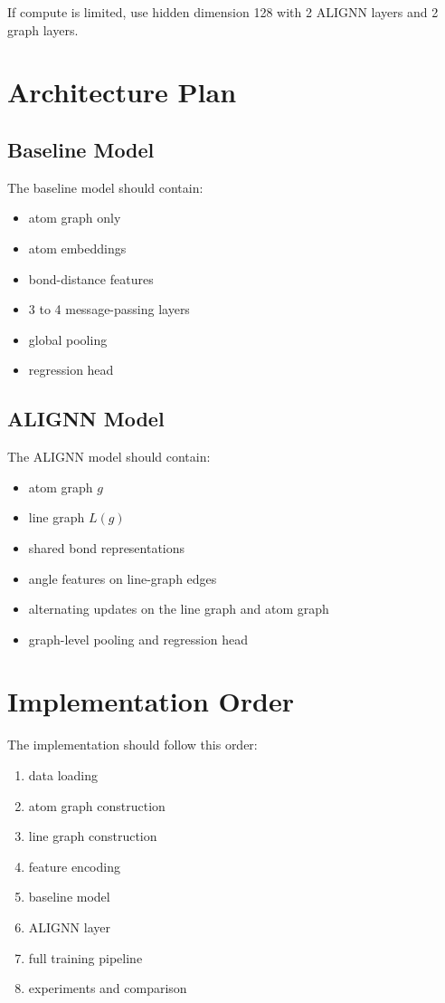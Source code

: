 \documentclass[12pt]{article}
\begin{document}
If compute is limited, use hidden dimension 128 with 2 ALIGNN layers and 2 graph layers.

\section{Architecture Plan}
\subsection{Baseline Model}
The baseline model should contain:
\begin{itemize}
    \item atom graph only
    \item atom embeddings
    \item bond-distance features
    \item 3 to 4 message-passing layers
    \item global pooling
    \item regression head
\end{itemize}

\subsection{ALIGNN Model}
The ALIGNN model should contain:
\begin{itemize}
    \item atom graph \(g\)
    \item line graph \(L(g)\)
    \item shared bond representations
    \item angle features on line-graph edges
    \item alternating updates on the line graph and atom graph
    \item graph-level pooling and regression head
\end{itemize}

\section{Implementation Order}
The implementation should follow this order:

\begin{enumerate}
    \item data loading
    \item atom graph construction
    \item line graph construction
    \item feature encoding
    \item baseline model
    \item ALIGNN layer
    \item full training pipeline
    \item experiments and comparison
\end{enumerate}
\end{document}
